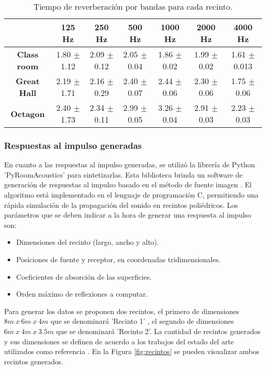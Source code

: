 \begin{table}[H]
\centering{}
\caption{Tiempo de reverberación por bandas para cada recinto.}
\begin{adjustbox}{max width=\textwidth}
\begin{tabular}{|c|c|c|c|c|c|c|}
\hline
                    & \textbf{125 Hz} & \textbf{250 Hz} & \textbf{500 Hz} & \textbf{1000 Hz} & \textbf{2000 Hz} & \textbf{4000 Hz} \\ \hline
\textbf{Class room} & 1.80 $\pm$ 1.12 & 2.09 $\pm$ 0.12 & 2.05 $\pm$ 0.04 & 1.86 $\pm$ 0.02  & 1.99 $\pm$ 0.02  & 1.61 $\pm$ 0.013 \\ \hline
\textbf{Great Hall} & 2.19 $\pm$ 1.71 & 2.16 $\pm$ 0.29 & 2.40 $\pm$ 0.07 & 2.44 $\pm$ 0.06  & 2.30 $\pm$ 0.06  & 1.75 $\pm$ 0.06  \\ \hline
\textbf{Octagon}    & 2.40 $\pm$ 1.73 & 2.34 $\pm$ 0.11 & 2.99 $\pm$ 0.05 & 3.26 $\pm$ 0.04  & 2.91 $\pm$ 0.03  & 2.23 $\pm$ 0.03  \\ \hline
\end{tabular}
\end{adjustbox}
\label{table:trs_recintos}
\end{table}


\subsubsection{Respuestas al impulso generadas}

En cuanto a las respuestas al impulso generadas, se utilizó la librería de Python 'PyRoomAcoustics' \cite{pyroom} para sintetizarlas. Esta biblioteca brinda un software de generación de respuestas al impulso basado en el método de fuente imagen  \cite{ISM}. El algoritmo está implementado en el lenguaje de programación C, permitiendo una rápida simulación de la propagación del sonido en recintos poliédricos. Los parámetros que se deben indicar a la hora de generar una respuesta al impulso son: 

\begin{itemize}
\item Dimensiones del recinto (largo, ancho y alto).
\item Posiciones de fuente y receptor, en coordenadas tridimensionales.
\item Coeficientes de absorción de las superficies.
\item Orden máximo de reflexiones a computar.
\end{itemize} 

Para generar los datos se proponen dos recintos, el primero de dimensiones $8m\: x\: 6m\: x\: 4m$ que se denominará 'Recinto 1' , el segundo de dimensiones $6m\: x\: 4m\: x\: 3.5m$ que se denominará 'Recinto 2'. La cantidad de recintos generados y sus dimensiones se definen de acuerdo a los trabajos del estado del arte utilizados como referencia \cite{rir_filtinverso, FCN}.  En la Figura \ref{fig:recintos} se pueden visualizar ambos recintos generados. 

